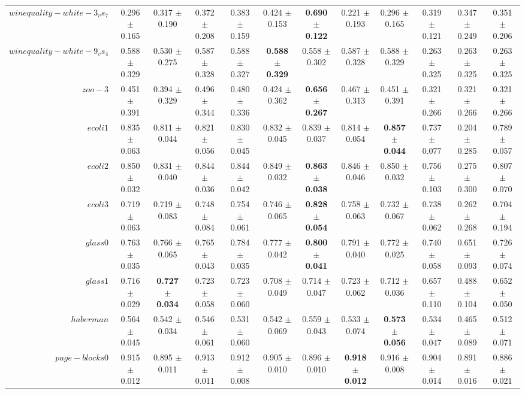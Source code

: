 \begin{table}[!ht]
{\begin{tabular}{r c c c c c c c c c c c}
$winequality-white-3_vs_7$ & 0.296 $\pm$ 0.165 & 0.317 $\pm$ 0.190 & 0.372 $\pm$ 0.208 & 0.383 $\pm$ 0.159 & 0.424 $\pm$ 0.153 & \textbf{0.690 $\pm$ 0.122} & 0.221 $\pm$ 0.193 & 0.296 $\pm$ 0.165 & 0.319 $\pm$ 0.121 & 0.347 $\pm$ 0.249 & 0.351 $\pm$ 0.206 \\
$winequality-white-9_vs_4$ & 0.588 $\pm$ 0.329 & 0.530 $\pm$ 0.275 & 0.587 $\pm$ 0.328 & 0.588 $\pm$ 0.327 & \textbf{0.588 $\pm$ 0.329} & 0.558 $\pm$ 0.302 & 0.587 $\pm$ 0.328 & 0.588 $\pm$ 0.329 & 0.263 $\pm$ 0.325 & 0.263 $\pm$ 0.325 & 0.263 $\pm$ 0.325 \\
$zoo-3$ & 0.451 $\pm$ 0.391 & 0.394 $\pm$ 0.329 & 0.496 $\pm$ 0.344 & 0.480 $\pm$ 0.336 & 0.424 $\pm$ 0.362 & \textbf{0.656 $\pm$ 0.267} & 0.467 $\pm$ 0.313 & 0.451 $\pm$ 0.391 & 0.321 $\pm$ 0.266 & 0.321 $\pm$ 0.266 & 0.321 $\pm$ 0.266 \\
$ecoli1$ & 0.835 $\pm$ 0.063 & 0.811 $\pm$ 0.044 & 0.821 $\pm$ 0.056 & 0.830 $\pm$ 0.045 & 0.832 $\pm$ 0.045 & 0.839 $\pm$ 0.037 & 0.814 $\pm$ 0.054 & \textbf{0.857 $\pm$ 0.044} & 0.737 $\pm$ 0.077 & 0.204 $\pm$ 0.285 & 0.789 $\pm$ 0.057 \\
$ecoli2$ & 0.850 $\pm$ 0.032 & 0.831 $\pm$ 0.040 & 0.844 $\pm$ 0.036 & 0.844 $\pm$ 0.042 & 0.849 $\pm$ 0.032 & \textbf{0.863 $\pm$ 0.038} & 0.846 $\pm$ 0.046 & 0.850 $\pm$ 0.032 & 0.756 $\pm$ 0.103 & 0.275 $\pm$ 0.300 & 0.807 $\pm$ 0.070 \\
$ecoli3$ & 0.719 $\pm$ 0.063 & 0.719 $\pm$ 0.083 & 0.748 $\pm$ 0.084 & 0.754 $\pm$ 0.061 & 0.746 $\pm$ 0.065 & \textbf{0.828 $\pm$ 0.054} & 0.758 $\pm$ 0.063 & 0.732 $\pm$ 0.067 & 0.738 $\pm$ 0.062 & 0.262 $\pm$ 0.268 & 0.704 $\pm$ 0.194 \\
$glass0$ & 0.763 $\pm$ 0.035 & 0.766 $\pm$ 0.065 & 0.765 $\pm$ 0.043 & 0.784 $\pm$ 0.035 & 0.777 $\pm$ 0.042 & \textbf{0.800 $\pm$ 0.041} & 0.791 $\pm$ 0.040 & 0.772 $\pm$ 0.025 & 0.740 $\pm$ 0.058 & 0.651 $\pm$ 0.093 & 0.726 $\pm$ 0.074 \\
$glass1$ & 0.716 $\pm$ 0.029 & \textbf{0.727 $\pm$ 0.034} & 0.723 $\pm$ 0.058 & 0.723 $\pm$ 0.060 & 0.708 $\pm$ 0.049 & 0.714 $\pm$ 0.047 & 0.723 $\pm$ 0.062 & 0.712 $\pm$ 0.036 & 0.657 $\pm$ 0.110 & 0.488 $\pm$ 0.104 & 0.652 $\pm$ 0.050 \\
$haberman$ & 0.564 $\pm$ 0.045 & 0.542 $\pm$ 0.034 & 0.546 $\pm$ 0.061 & 0.531 $\pm$ 0.060 & 0.542 $\pm$ 0.069 & 0.559 $\pm$ 0.043 & 0.533 $\pm$ 0.074 & \textbf{0.573 $\pm$ 0.056} & 0.534 $\pm$ 0.047 & 0.465 $\pm$ 0.089 & 0.512 $\pm$ 0.071 \\
$page-blocks0$ & 0.915 $\pm$ 0.012 & 0.895 $\pm$ 0.011 & 0.913 $\pm$ 0.011 & 0.912 $\pm$ 0.008 & 0.905 $\pm$ 0.010 & 0.896 $\pm$ 0.010 & \textbf{0.918 $\pm$ 0.012} & 0.916 $\pm$ 0.008 & 0.904 $\pm$ 0.014 & 0.891 $\pm$ 0.016 & 0.886 $\pm$ 0.021 \\

\end{tabular}}
\end{table}
